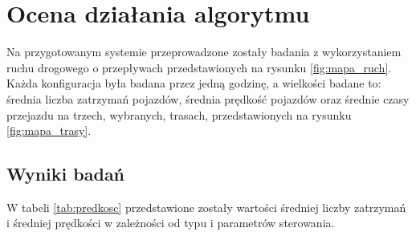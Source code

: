 \chapter{Ocena działania algorytmu}
\label{chap:ocena}
Na przygotowanym systemie przeprowadzone zostały badania z wykorzystaniem ruchu drogowego o przepływach przedstawionych na rysunku \ref{fig:mapa_ruch}. Każda konfiguracja była badana przez jedną godzinę, a wielkości badane to: średnia liczba zatrzymań pojazdów, średnia prędkość pojazdów oraz średnie czasy przejazdu na trzech, wybranych, trasach, przedstawionych na rysunku \ref{fig:mapa_trasy}.

\section{Wyniki badań}
W tabeli \ref{tab:predkosc} przedstawione zostały wartości średniej liczby zatrzymań i średniej prędkości w zależności od typu i parametrów sterowania.


